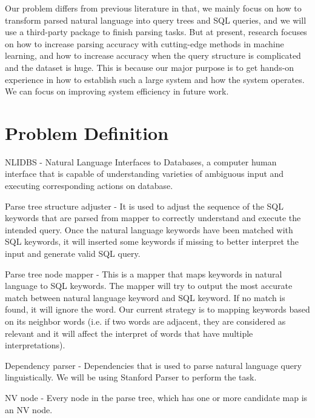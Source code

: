 \documentclass[twocolumn]{article}
\begin{document}
Our problem differs from previous literature in that, we mainly focus on how to transform parsed natural language into query trees and SQL queries, and we will use a third-party package to finish parsing tasks. But at present, research focuses on how to increase parsing accuracy with cutting-edge methods in machine learning, and how to increase accuracy when the query structure is complicated and the dataset is huge. This is because our major purpose is to get hands-on experience in how to establish such a large system and how the system operates. We can focus on improving system efficiency in future work.


\section{Problem Definition}
NLIDBS - Natural Language Interfaces to Databases, a computer human interface that is capable of understanding varieties of ambiguous input and executing corresponding actions on database.
      
Parse tree structure adjuster - It is used to adjust the sequence of the SQL keywords that are parsed from mapper to correctly understand and execute the intended query.  Once the natural language keywords have been matched with SQL keywords, it will inserted some keywords if missing to better interpret the input and  generate valid SQL query.
      
Parse tree node mapper - This is a mapper that maps keywords in natural language to SQL keywords. The mapper will try to output the most accurate match between natural language keyword and SQL keyword. If no match is found, it will ignore the word. Our current strategy is to mapping keywords based on its neighbor words (i.e. if two words are adjacent, they are considered as relevant and it will affect the interpret of words that have multiple interpretations).
      
Dependency parser - Dependencies that is used to parse natural language query linguistically.  We will be using Stanford Parser to perform the task.
      
NV node - Every node in the parse tree, which has one or more candidate map is an NV node.
	
\end{document}
